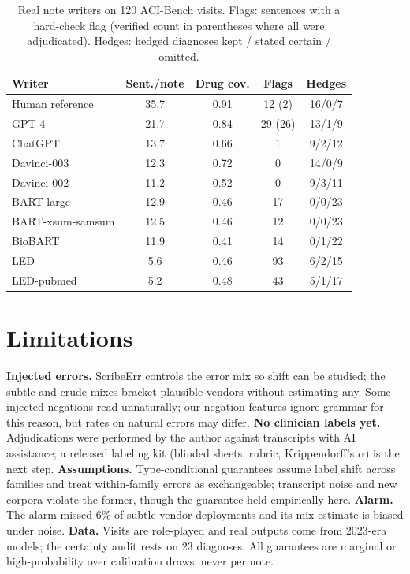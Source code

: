 \documentclass[10pt,twocolumn]{article}
\begin{document}
\begin{table}[t]
\centering\small
\setlength{\tabcolsep}{3.5pt}
\caption{Real note writers on 120 ACI-Bench visits. Flags: sentences with a hard-check flag (verified count in parentheses where all were adjudicated). Hedges: hedged diagnoses kept / stated certain / omitted.}\label{tab:real}
\begin{tabular}{@{}lcccc@{}}
\toprule
Writer & Sent./note & Drug cov. & Flags & Hedges\\
\midrule
Human reference & 35.7 & 0.91 & 12 (2) & 16/0/7\\
GPT-4 & 21.7 & 0.84 & 29 (26) & 13/1/9\\
ChatGPT & 13.7 & 0.66 & 1 & 9/2/12\\
Davinci-003 & 12.3 & 0.72 & 0 & 14/0/9\\
Davinci-002 & 11.2 & 0.52 & 0 & 9/3/11\\
BART-large & 12.9 & 0.46 & 17 & 0/0/23\\
BART-xsum-samsum & 12.5 & 0.46 & 12 & 0/0/23\\
BioBART & 11.9 & 0.41 & 14 & 0/1/22\\
LED & 5.6 & 0.46 & 93 & 6/2/15\\
LED-pubmed & 5.2 & 0.48 & 43 & 5/1/17\\
\bottomrule
\end{tabular}
\end{table}

\section{Limitations}
\textbf{Injected errors.} ScribeErr controls the error mix so shift can be studied; the subtle and crude mixes bracket plausible vendors without estimating any. Some injected negations read unnaturally; our negation features ignore grammar for this reason, but rates on natural errors may differ. \textbf{No clinician labels yet.} Adjudications were performed by the author against transcripts with AI assistance; a released labeling kit (blinded sheets, rubric, Krippendorff's $\alpha$) is the next step. \textbf{Assumptions.} Type-conditional guarantees assume label shift across families and treat within-family errors as exchangeable; transcript noise and new corpora violate the former, though the guarantee held empirically here. \textbf{Alarm.} The alarm missed 6\% of subtle-vendor deployments and its mix estimate is biased under noise. \textbf{Data.} Visits are role-played and real outputs come from 2023-era models; the certainty audit rests on 23 diagnoses. All guarantees are marginal or high-probability over calibration draws, never per note.
\end{document}
